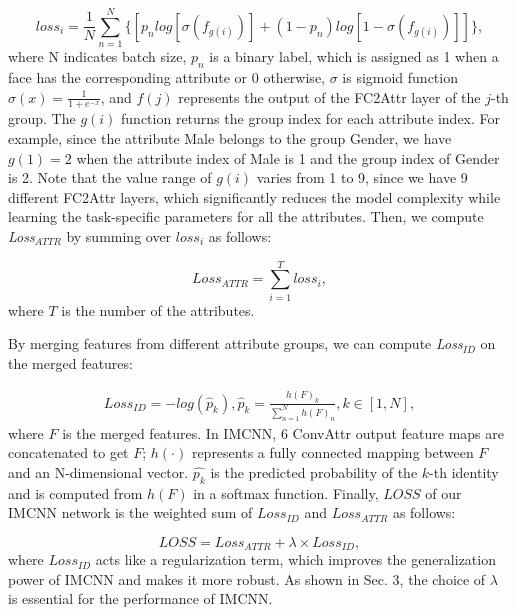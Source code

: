 \documentclass[wcp]{jmlr}
\begin{document}
	\begin{equation*}
	loss_{i} = \frac{1}{N}\sum_{n=1}^N\{[p_{n}log[\sigma(f_{g(i)})] + (1-p_{n})log[1-\sigma(f_{g(i)})] ]\},
	\end{equation*}
	where N indicates batch size, $p_{n}$ is a binary label, which is assigned as 1 when a face has the corresponding attribute or 0 otherwise, $\sigma$ is sigmoid function $\sigma(x) = \frac{1}{1+e^{-x}}$, and $f(j)$ represents the output of the FC2Attr layer of the $j$-th group. The $g(i)$ function returns the group index for each attribute index. For example, since the attribute Male belongs to the group Gender, we have $g(1)=2$ when the attribute index of Male is 1 and the group index of Gender is 2. Note that the value range of $g(i)$ varies from 1 to 9, since we have 9 different FC2Attr layers, which significantly reduces the model complexity while learning the task-specific parameters for all the attributes. Then, we compute \emph{Loss$_{ATTR}$} by summing over $loss_{i}$ as follows:
	
	\begin{equation*}
	Loss_{ATTR} = \sum_{i=1}^{T}{loss_i},
	\end{equation*}
	where $T$ is the number of the attributes.
	
	By merging features from different attribute groups, we can compute \emph{Loss$_{ID}$} on the merged features:
	
	\begin{equation*}
	\begin{split}
	Loss_{ID} = -log(\hat{p}_{k}), \hat{p}_{k} = \frac{h(F)_k}{\sum_{n=1}^{N}{h(F)_n}}, k \in{[1, N]},
	\end{split}
	\end{equation*}
	where $F$ is the merged features. In IMCNN, 6 ConvAttr output feature maps are concatenated to get $F$; $h(\cdot)$ represents a fully connected mapping between $F$ and an N-dimensional vector. $\hat{p_k}$ is the predicted probability of the $k$-th identity and is computed from $h(F)$ in a softmax function. Finally, $LOSS$ of our IMCNN network is the weighted sum of $Loss_{ID}$ and $Loss_{ATTR}$ as follows:
	
	\begin{equation}
	LOSS = Loss_{ATTR} + \lambda\times Loss_{ID},
	\label{LOSS}
	\end{equation}
	where $Loss_{ID}$ acts like a regularization term, which improves the generalization power of IMCNN and makes it more robust. As shown in Sec. 3, the choice of $\lambda$ is essential for the performance of IMCNN.
	
\end{document}
